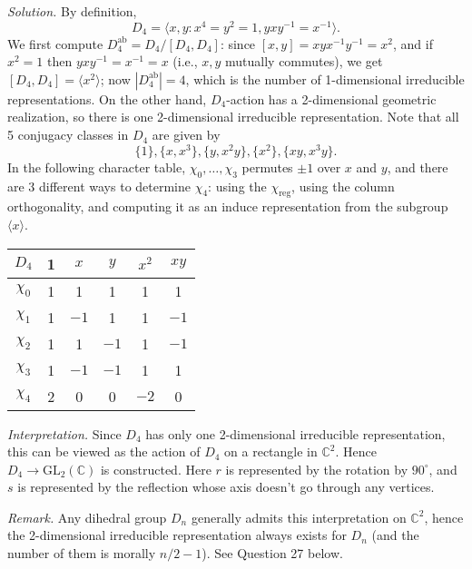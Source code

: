 \documentclass{mathproblems}
\newcommand\C{\mathbb{C}}
\newcommand\GL{\mathrm{GL}}
\begin{document}
\begin{questions}
\textit{Solution.} By definition,
$$
D_4=\langle x,y: x^4=y^2=1, y x y^{-1}=x^{-1}\rangle.
$$
We first compute $D_4^{\mathrm{ab}}=D_4/[D_4,D_4]$: since $[x,y]=xyx^{-1}y^{-1}=x^2$, and if $x^2=1$ then $y x y^{-1}=x^{-1}=x$ (i.e., $x,y$ mutually commutes), we get $[D_4,D_4]=\langle x^2\rangle$; now $|D_4^{\mathrm{ab}}|=4$, which is the number of 1-dimensional irreducible representations. On the other hand, $D_4$-action has a 2-dimensional geometric realization, so there is one 2-dimensional irreducible representation. Note that all 5 conjugacy classes in $D_4$ are given by
$$
\{1\}, \{x,x^3\}, \{y, x^2 y\}, \{x^2\}, \{x y, x^3 y\}.
$$
In the following character table, $\chi_0,\ldots,\chi_3$ permutes $\pm 1$ over $x$ and $y$, and there are 3 different ways to determine $\chi_4$: using the $\chi_{\mathrm{reg}}$, using the column orthogonality, and computing it as an induce representation from the subgroup $\langle x\rangle$.
\begin{center}
\begin{tabular}{c|ccccc}
$D_4$ & 1 & $x$ & $y$ & $x^2$ & $x y$\\
\hline
$\chi_0$ & 1 & 1 & 1 & 1 & 1 \\
$\chi_1$ & 1 & $-1$ & 1 & 1 & $-1$ \\
$\chi_2$ & 1 & 1 & $-1$ & 1 & $-1$ \\
$\chi_3$ & 1 & $-1$ & $-1$ & 1 & 1 \\
$\chi_4$ & 2 & 0 & 0 & $-2$ & 0 \\
\end{tabular}
\end{center}

\textit{Interpretation.} Since $D_4$ has only one 2-dimensional irreducible representation, this can be viewed as the action of $D_4$ on a rectangle in $\C^2$. Hence $D_4\to \GL_2(\C)$ is constructed. Here $r$ is represented by the rotation by $90^\circ$, and $s$ is represented by the reflection whose axis doesn't go through any vertices.

\textit{Remark.} Any dihedral group $D_n$ generally admits this interpretation on $\C^2$, hence the 2-dimensional irreducible representation always exists for $D_n$ (and the number of them is morally $n/2-1$). See Question 27 below.



\end{questions}
\end{document}
